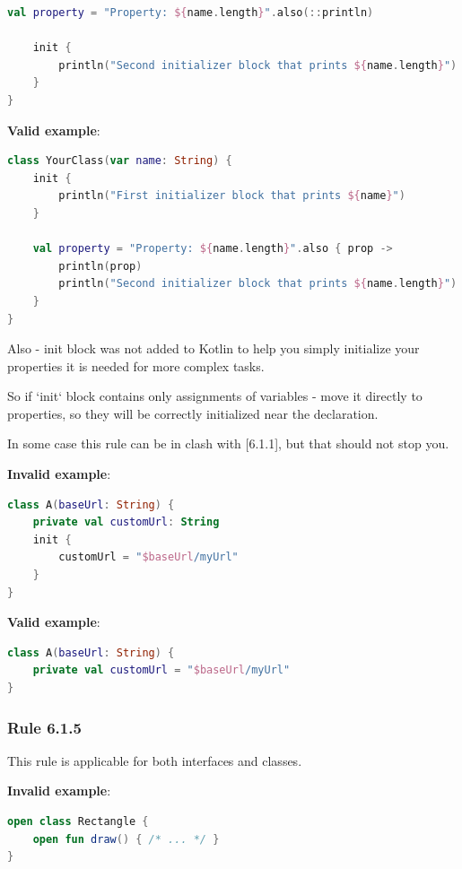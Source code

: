 {{{{\begin{lstlisting}[language=Kotlin]
    val property = "Property: ${name.length}".also(::println)

    init {
        println("Second initializer block that prints ${name.length}")
    }
}
\end{lstlisting}


\textbf{Valid example}:

\begin{lstlisting}[language=Kotlin]
class YourClass(var name: String) {
    init {
        println("First initializer block that prints ${name}")
    }

    val property = "Property: ${name.length}".also { prop ->
        println(prop)
        println("Second initializer block that prints ${name.length}")
    }
}
\end{lstlisting}


Also - init block was not added to Kotlin to help you simply initialize your properties it is needed for more complex tasks.

So if `init` block contains only assignments of variables - move it directly to properties, so they will be correctly initialized near the declaration.

In some case this rule can be in clash with [6.1.1], but that should not stop you.



\textbf{Invalid example}:

\begin{lstlisting}[language=Kotlin]
class A(baseUrl: String) {
    private val customUrl: String
    init {
        customUrl = "$baseUrl/myUrl"
    }
}
\end{lstlisting}


\textbf{Valid example}:

\begin{lstlisting}[language=Kotlin]
class A(baseUrl: String) {
    private val customUrl = "$baseUrl/myUrl"
}
\end{lstlisting}


\subsubsection*{\textbf{Rule 6.1.5}}
\leavevmode\newline

This rule is applicable for both interfaces and classes.



\textbf{Invalid example}:

\begin{lstlisting}[language=Kotlin]
open class Rectangle {
    open fun draw() { /* ... */ }
}


\end{lstlisting}}}}}

